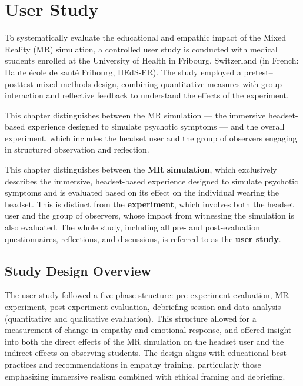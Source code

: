 \chapter{User Study}
\label{ch:userstudy}


To systematically evaluate the educational and empathic impact of the Mixed Reality (MR) simulation, a controlled user study is conducted with medical students enrolled at the University of Health in Fribourg, Switzerland (in French: Haute école de santé Fribourg, HEdS-FR). The study employed a pretest–posttest mixed-methods design, combining quantitative measures with group interaction and reflective feedback to understand the effects of the experiment.

\vspace{1em}

This chapter distinguishes between the MR simulation — the immersive headset-based experience designed to simulate psychotic symptoms — and the overall experiment, which includes the headset user and the group of observers engaging in structured observation and reflection.

This chapter distinguishes between the \textbf{MR simulation}, which exclusively describes the immersive, headset-based experience designed to simulate psychotic symptoms and is evaluated based on its effect on the individual wearing the headset. This is distinct from the \textbf{experiment}, which involves both the headset user  and the group of observers, whose impact from witnessing the simulation is also evaluated. The whole study, including all pre- and post-evaluation questionnaires, reflections, and discussions, is referred to as the \textbf{user study}.

\section{Study Design Overview}

The user study followed a five-phase structure: pre-experiment evaluation, MR experiment, post-experiment evaluation, debriefing session and data analysis (quantitative and qualitative evaluation). This structure allowed for a measurement of change in empathy and emotional response, and offered insight into both the direct effects of the MR simulation on the headset user and the indirect effects on observing students. The design aligns with educational best practices and recommendations in empathy training, particularly those emphasizing immersive realism combined with ethical framing and debriefing.


